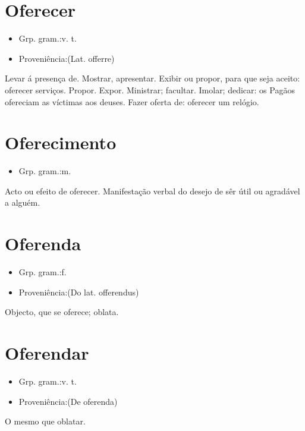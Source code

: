 \section{Oferecer}
\begin{itemize}
\item {Grp. gram.:v. t.}
\end{itemize}
\begin{itemize}
\item {Proveniência:(Lat. \textunderscore offerre\textunderscore )}
\end{itemize}
Levar á presença de.
Mostrar, apresentar.
Exibir ou propor, para que seja aceito: \textunderscore oferecer serviços\textunderscore .
Propor.
Expor.
Ministrar; facultar.
Imolar; dedicar: \textunderscore os Pagãos ofereciam as víctimas aos deuses\textunderscore .
Fazer oferta de: \textunderscore oferecer um relógio\textunderscore .
\section{Oferecimento}
\begin{itemize}
\item {Grp. gram.:m.}
\end{itemize}
Acto ou efeito de oferecer.
Manifestação verbal do desejo de sêr útil ou agradável a alguém.
\section{Oferenda}
\begin{itemize}
\item {Grp. gram.:f.}
\end{itemize}
\begin{itemize}
\item {Proveniência:(Do lat. \textunderscore offerendus\textunderscore )}
\end{itemize}
Objecto, que se oferece; oblata.
\section{Oferendar}
\begin{itemize}
\item {Grp. gram.:v. t.}
\end{itemize}
\begin{itemize}
\item {Proveniência:(De \textunderscore oferenda\textunderscore )}
\end{itemize}
O mesmo que \textunderscore oblatar\textunderscore .
